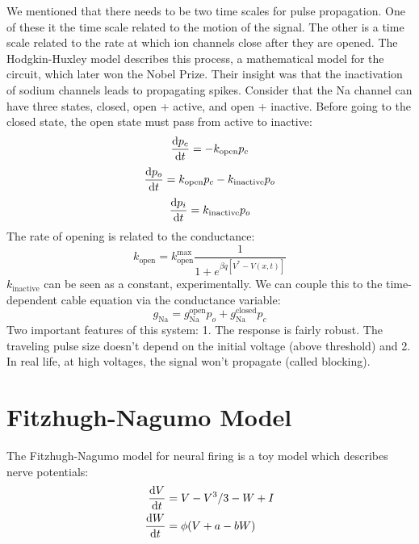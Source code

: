 \documentclass[a4paper,twoside,master.tex]{subfiles}
\begin{document}

We mentioned that there needs to be two time scales for pulse propagation. One of these it the time scale related to the motion of the signal. The other is a time scale related to the rate at which ion channels close after they are opened. The Hodgkin-Huxley model describes this process, a mathematical model for the circuit, which later won the Nobel Prize. Their insight was that the inactivation of sodium channels leads to propagating spikes. Consider that the Na channel can have three states, closed, open + active, and open + inactive. Before going to the closed state, the open state must pass from active to inactive:
\begin{equation}
    \dv{p_c}{t} = - k_{\text{open}} p_c
\end{equation}
\begin{equation}
    \dv{p_o}{t} = k_{\text{open}} p_c - k_{\text{inactive}} p_o
\end{equation}
\begin{equation}
    \dv{p_i}{t} = k_{\text{inactive}} p_o
\end{equation}
The rate of opening is related to the conductance:
\begin{equation}
    k_{\text{open}} = k_{\text{open}}^{\text{max}} \frac{1}{1 + e^{\beta q[V^* - V(x,t)]}}
\end{equation}
$ k_{\text{inactive}} $ can be seen as a constant, experimentally. We can couple this to the time-dependent cable equation via the conductance variable:
\begin{equation}
    g_{\text{Na}} = g_{\text{Na}}^{\text{open}} p_o + g_{\text{Na}}^{\text{closed}} p_c
\end{equation}
Two important features of this system: 1. The response is fairly robust. The traveling pulse size doesn't depend on the initial voltage (above threshold) and 2. In real life, at high voltages, the signal won't propagate (called blocking).

\section{Fitzhugh-Nagumo Model}\label{sec:fitzhugh-nagumo_model}

The Fitzhugh-Nagumo model for neural firing is a toy model which describes nerve potentials:
\begin{align}
    \dv{V}{t} &= V - V^3 / 3 - W + I \\
    \dv{W}{t} &= \phi (V + a - bW)
\end{align}
\end{document}
